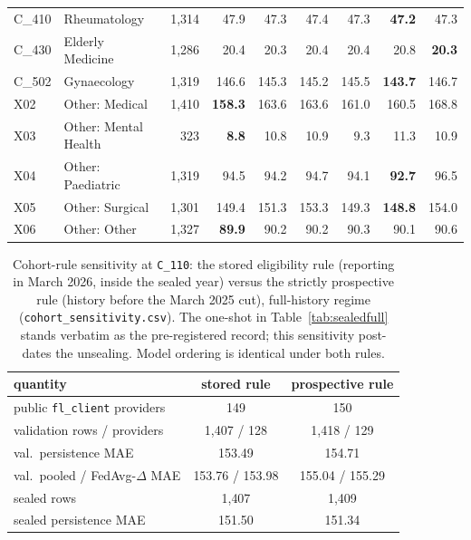 \documentclass[conference]{IEEEtran}
\begin{document}
\begin{table}[t]
\begin{tabular}{llrrrrrrr}
C\_410 & Rheumatology & 1{,}314 & 47.9 & 47.3 & 47.4 & 47.3 & \textbf{47.2} & 47.3 \\
C\_430 & Elderly Medicine & 1{,}286 & 20.4 & 20.3 & 20.4 & 20.4 & 20.8 & \textbf{20.3} \\
C\_502 & Gynaecology & 1{,}319 & 146.6 & 145.3 & 145.2 & 145.5 & \textbf{143.7} & 146.7 \\
X02 & Other: Medical & 1{,}410 & \textbf{158.3} & 163.6 & 163.6 & 161.0 & 160.5 & 168.8 \\
X03 & Other: Mental Health & 323 & \textbf{8.8} & 10.8 & 10.9 & 9.3 & 11.3 & 10.9 \\
X04 & Other: Paediatric & 1{,}319 & 94.5 & 94.2 & 94.7 & 94.1 & \textbf{92.7} & 96.5 \\
X05 & Other: Surgical & 1{,}301 & 149.4 & 151.3 & 153.3 & 149.3 & \textbf{148.8} & 154.0 \\
X06 & Other: Other & 1{,}327 & \textbf{89.9} & 90.2 & 90.2 & 90.3 & 90.1 & 90.6 \\
\bottomrule
\end{tabular}
\end{table}

\begin{table}[t]
\caption{Cohort-rule sensitivity at \texttt{C\_110}: the stored eligibility rule (reporting in
March 2026, inside the sealed year) versus the strictly prospective rule (history before the
March 2025 cut), full-history regime (\texttt{cohort\_sensitivity.csv}). The one-shot in
Table~\ref{tab:sealedfull} stands verbatim as the pre-registered record; this sensitivity
post-dates the unsealing. Model ordering is identical under both rules.}
\label{tab:cohort}
\centering
\scriptsize
\setlength{\tabcolsep}{3.5pt}
\begin{tabular}{lcc}
\toprule
quantity & stored rule & prospective rule \\
\midrule
public \texttt{fl\_client} providers & 149 & 150 \\
validation rows / providers & 1{,}407 / 128 & 1{,}418 / 129 \\
val.\ persistence MAE & 153.49 & 154.71 \\
val.\ pooled / FedAvg-$\Delta$ MAE & 153.76 / 153.98 & 155.04 / 155.29 \\
sealed rows & 1{,}407 & 1{,}409 \\
sealed persistence MAE & 151.50 & 151.34 \\
\bottomrule
\end{tabular}
\end{table}
\end{document}
